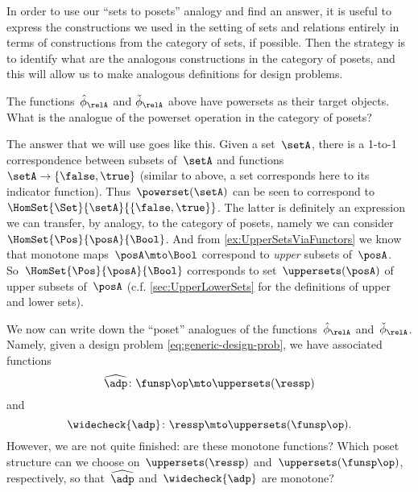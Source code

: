 In order to use our ``sets to posets'' analogy and find an answer, it is useful to express the constructions we used in the setting of sets and relations entirely in terms of constructions from the category of sets, if possible.
Then the strategy is to identify what are the analogous constructions in the category of posets, and this will allow us to make analogous definitions for design problems.

The functions~$\hat \phi_{\relA}$ and $\check \phi_{\relA}$ above have powersets as their target objects. What is the analogue of the powerset operation in the category of posets?

The answer that we will use goes like this.
Given a set~$\setA$, there is a 1-to-1 correspondence between subsets of~$\setA$ and functions~$\setA \to \{ \false, \true \}$ (similar to above, a set corresponds here to its indicator function).
Thus~$\powerset (\setA)$ can be seen to correspond to~$\HomSet{\Set}{\setA}{\{ \false, \true\}}$.
The latter is definitely an expression we can transfer, by analogy, to the category of posets, namely we can consider~$\HomSet{\Pos}{\posA}{\Bool}$.
And from \cref{ex:UpperSetsViaFunctors} we know that monotone maps~$\posA \mto \Bool$ correspond to \emph{upper} subsets of~$\posA$.
So~$\HomSet{\Pos}{\posA}{\Bool}$ corresponds to set~$\uppersets (\posA)$ of upper subsets of~$\posA$ (c.f. \cref{sec:UpperLowerSets} for the definitions of upper and lower sets).

We now can write down the ``poset'' analogues of the functions~$\hat \phi_{\relA}$ and~$\check \phi_{\relA}$.
Namely, given a design problem \cref{eq:generic-design-prob}, we have associated functions
\begin{equation}\label{eq:dp-left-curry}
\widehat{\adp} \colon \funsp\op \mto \uppersets (\ressp)
\end{equation}
and 
\begin{equation}\label{eq:dp-right-curry}
\widecheck{\adp} \colon \ressp \mto \uppersets (\funsp\op).
\end{equation}
However, we are not quite finished: are these monotone functions? Which poset structure can we choose on~$\uppersets (\ressp)$ and~$\uppersets (\funsp\op)$,
respectively, so that~$\widehat{\adp}$ and~$\widecheck{\adp}$ are monotone?

